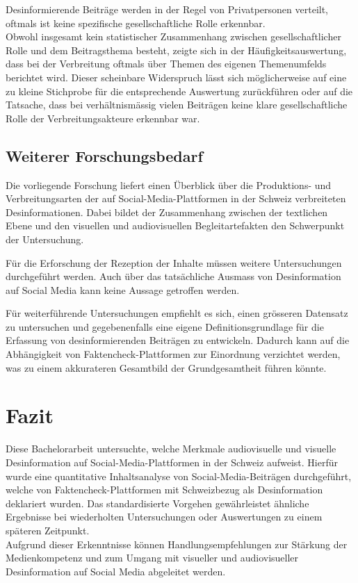 \documentclass[12pt,a4paper]{article}        %
\begin{document}
Desinformierende Beiträge werden in der Regel von Privatpersonen verteilt, oftmals ist keine spezifische gesellschaftliche Rolle erkennbar. \\
Obwohl insgesamt kein statistischer Zusammenhang zwischen gesellschaftlicher Rolle und dem Beitragsthema besteht, zeigte sich in der Häufigkeitsauswertung, dass bei der Verbreitung oftmals über Themen des eigenen Themenumfelds berichtet wird. Dieser scheinbare Widerspruch lässt sich möglicherweise auf eine zu kleine Stichprobe für die entsprechende Auswertung zurückführen oder auf die Tatsache, dass bei verhältnismässig vielen Beiträgen keine klare gesellschaftliche Rolle der Verbreitungsakteure erkennbar war.

\subsection{Weiterer Forschungsbedarf}
Die vorliegende Forschung liefert einen Überblick über die Produktions- und Verbreitungsarten der auf Social-Media-Plattformen in der Schweiz verbreiteten Desinformationen. Dabei bildet der Zusammenhang zwischen der textlichen Ebene und den visuellen und audiovisuellen Begleitartefakten den Schwerpunkt der Untersuchung.

Für die Erforschung der Rezeption der Inhalte müssen weitere Untersuchungen durchgeführt werden. Auch über das tatsächliche Ausmass von Desinformation auf Social Media kann keine Aussage getroffen werden.

Für weiterführende Untersuchungen empfiehlt es sich, einen grösseren Datensatz zu untersuchen und gegebenenfalls eine eigene Definitionsgrundlage für die Erfassung von desinformierenden Beiträgen zu entwickeln. Dadurch kann auf die Abhängigkeit von Faktencheck-Plattformen zur Einordnung verzichtet werden, was zu einem akkurateren Gesamtbild der Grundgesamtheit führen könnte. 
\pagebreak
\section{Fazit}
Diese Bachelorarbeit untersuchte, welche Merkmale audiovisuelle und visuelle Desinformation auf Social-Media-Plattformen in der Schweiz aufweist. Hierfür wurde eine quantitative Inhaltsanalyse von Social-Media-Beiträgen durchgeführt, welche von Faktencheck-Plattformen mit Schweizbezug als Desinformation deklariert wurden. Das standardisierte Vorgehen gewährleistet ähnliche Ergebnisse bei wiederholten Untersuchungen oder Auswertungen zu einem späteren Zeitpunkt.\\
Aufgrund dieser Erkenntnisse können Handlungsempfehlungen zur Stärkung der Medienkompetenz und zum Umgang mit visueller und audiovisueller Desinformation auf Social Media abgeleitet werden.
\end{document}
